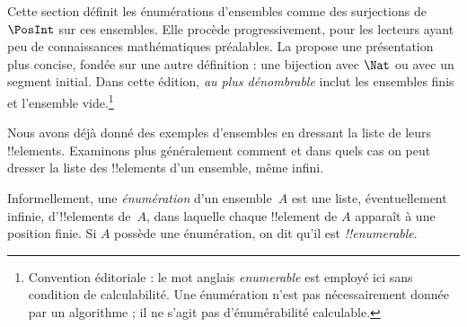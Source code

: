 \documentclass[11pt,a4paper,openany]{memoir}
\begin{document}


\begin{editorial}
Cette section définit les énumérations d’ensembles comme des surjections
de $\PosInt$ sur ces ensembles. Elle procède progressivement, pour
les lecteurs ayant peu de connaissances mathématiques préalables.
La  propose une présentation plus concise, fondée
sur une autre définition : une bijection avec $\Nat$ ou avec un segment
initial. Dans cette édition, \emph{au plus dénombrable} inclut les
ensembles finis et l’ensemble vide.\footnote{Convention éditoriale :
le mot anglais \emph{enumerable} est employé ici sans condition de
calculabilité. Une énumération n’est pas nécessairement donnée par
un algorithme ; il ne s’agit pas d’énumérabilité calculable.}
\end{editorial}

\begin{explain}
Nous avons déjà donné des exemples d’ensembles en dressant la liste
de leurs !!{element}s. Examinons plus généralement comment et dans
quels cas on peut dresser la liste des !!{element}s d’un ensemble,
même infini.
\end{explain}

\begin{defn}
Informellement, une \emph{énumération} d’un ensemble~$A$ est une liste,
éventuellement infinie, d’!!{element}s de~$A$, dans laquelle chaque
!!{element} de $A$ apparaît à une position finie. Si $A$ possède
une énumération, on dit qu’il est \emph{!!{enumerable}}.
\end{defn}
\end{document}
